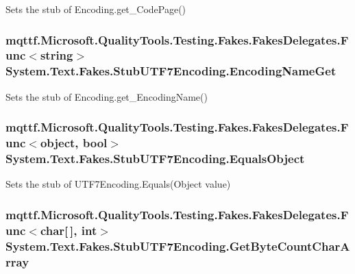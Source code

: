 Sets the stub of Encoding.\-get\-\_\-\-Code\-Page()

\hypertarget{class_system_1_1_text_1_1_fakes_1_1_stub_u_t_f7_encoding_a34b4c4c1ba61074bb555595fecc21851}{
\subsubsection[{Encoding\-Name\-Get}]{\setlength{\rightskip}{0pt plus 5cm}mqttf.\-Microsoft.\-Quality\-Tools.\-Testing.\-Fakes.\-Fakes\-Delegates.\-Func$<$string$>$ System.\-Text.\-Fakes.\-Stub\-U\-T\-F7\-Encoding.\-Encoding\-Name\-Get}}\label{class_system_1_1_text_1_1_fakes_1_1_stub_u_t_f7_encoding_a34b4c4c1ba61074bb555595fecc21851}


Sets the stub of Encoding.\-get\-\_\-\-Encoding\-Name()

\hypertarget{class_system_1_1_text_1_1_fakes_1_1_stub_u_t_f7_encoding_a8b3ec85651b6cefcd5658523caf1a8f6}{
\subsubsection[{Equals\-Object}]{\setlength{\rightskip}{0pt plus 5cm}mqttf.\-Microsoft.\-Quality\-Tools.\-Testing.\-Fakes.\-Fakes\-Delegates.\-Func$<$object, bool$>$ System.\-Text.\-Fakes.\-Stub\-U\-T\-F7\-Encoding.\-Equals\-Object}}\label{class_system_1_1_text_1_1_fakes_1_1_stub_u_t_f7_encoding_a8b3ec85651b6cefcd5658523caf1a8f6}


Sets the stub of U\-T\-F7\-Encoding.\-Equals(\-Object value)

\hypertarget{class_system_1_1_text_1_1_fakes_1_1_stub_u_t_f7_encoding_a2b176c0cfc572f76203d327eec1547ef}{
\subsubsection[{Get\-Byte\-Count\-Char\-Array}]{\setlength{\rightskip}{0pt plus 5cm}mqttf.\-Microsoft.\-Quality\-Tools.\-Testing.\-Fakes.\-Fakes\-Delegates.\-Func$<$char\mbox{[}$\,$\mbox{]}, int$>$ System.\-Text.\-Fakes.\-Stub\-U\-T\-F7\-Encoding.\-Get\-Byte\-Count\-Char\-Array}}\label{class_system_1_1_text_1_1_fakes_1_1_stub_u_t_f7_encoding_a2b176c0cfc572f76203d327eec1547ef}


